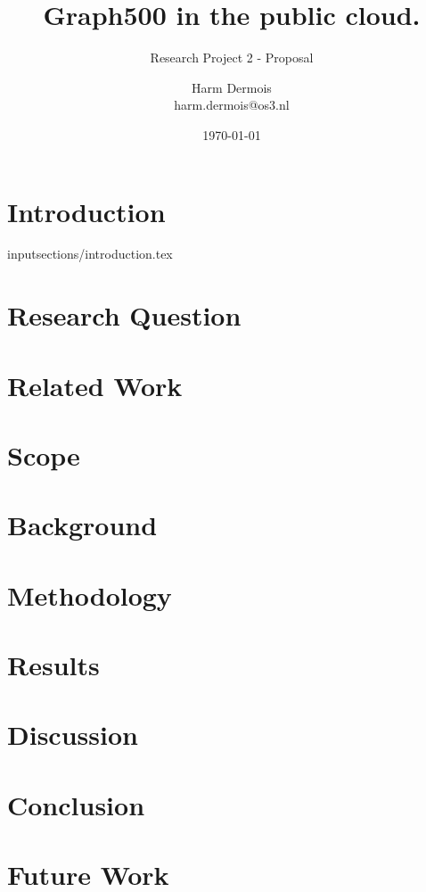 \documentclass[A4]{scrartcl}
\begin{document}
\title{Graph500 in the public cloud.}
\subtitle{Research Project 2 - Proposal}
\date{\today}
\author{Harm Dermois \\ harm.dermois@os3.nl}

\maketitle
\newpage
\tableofcontents
\newpage

\section{Introduction}
\label{sec:introduction}
input{sections/introduction.tex}


\section{Research Question}
\label{research-questions}



\section{Related Work}
\label{related-work}



\section{Scope}
\label{scope}


\section{Background}
\label{background}


\section{Methodology}
\label{methodology}


\section{Results}
\label{results}


\section{Discussion}
\label{discussion}


\section{Conclusion}
\label{conclusion}


\section{Future Work}
\label{future-work}


\printbibliography
\end{document}
